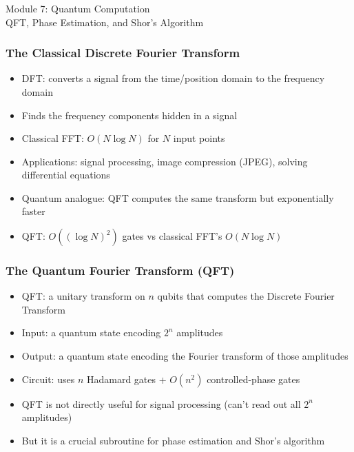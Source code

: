 
\begin{frame}[fragile]\frametitle{}
\begin{center}
{\Large Module 7: Quantum Computation}\\[0.5em]
{\large QFT, Phase Estimation, and Shor's Algorithm}
\end{center}
\end{frame}

\begin{frame}[fragile]\frametitle{The Classical Discrete Fourier Transform}
\begin{itemize}
\item DFT: converts a signal from the time/position domain to the frequency domain
\item Finds the frequency components hidden in a signal
\item Classical FFT: $O(N \log N)$ for $N$ input points
\item Applications: signal processing, image compression (JPEG), solving differential equations
\item Quantum analogue: QFT computes the same transform but exponentially faster
\item QFT: $O((\log N)^2)$ gates vs classical FFT's $O(N \log N)$
\end{itemize}
\end{frame}

\begin{frame}[fragile]\frametitle{The Quantum Fourier Transform (QFT)}
\begin{itemize}
\item QFT: a unitary transform on $n$ qubits that computes the Discrete Fourier Transform
\item Input: a quantum state encoding $2^n$ amplitudes
\item Output: a quantum state encoding the Fourier transform of those amplitudes
\item Circuit: uses $n$ Hadamard gates + $O(n^2)$ controlled-phase gates
\item QFT is not directly useful for signal processing (can't read out all $2^n$ amplitudes)
\item But it is a crucial subroutine for phase estimation and Shor's algorithm
\end{itemize}
\end{frame}

